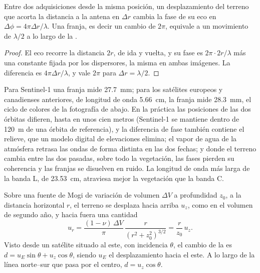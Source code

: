 \begin{theorem}\label{thm:b3:remote-sensing-gis:fringe}
Entre dos adquisiciones desde la misma posición, un desplazamiento del
terreno que acorta la distancia a la antena en $\Delta r$ cambia la
fase de su eco en $\Delta\phi = 4\pi\Delta r/\lambda$. Una franja, es decir un
cambio de $2\pi$, equivale a un movimiento de $\lambda/2$ a lo largo de la .
\end{theorem}

\begin{proof}
El eco recorre la distancia $2r$, de ida y vuelta, y su fase es
$2\pi\cdot 2r/\lambda$ más una constante fijada por los dispersores, la misma en
ambas imágenes. La diferencia es $4\pi\Delta r/\lambda$, y vale $2\pi$
para $\Delta r = \lambda/2$.
\end{proof}

Para Sentinel-1 una franja mide \qty{27.7}{mm}; para los satélites europeos y
canadienses anteriores, de longitud de onda \qty{5.66}{cm}, la franja mide \qty{28.3}{mm}, el
ciclo de colores de la fotografía de abajo. En la práctica las posiciones de las
dos órbitas difieren, hasta en unos cien metros (Sentinel-1 se mantiene
dentro de \qty{120}{m} de una órbita de referencia), y la diferencia de fase
también contiene el relieve, que un modelo digital de elevaciones elimina; el
vapor de agua de la atmósfera retrasa las ondas de forma distinta en las dos fechas;
y donde el terreno cambia entre las dos pasadas, sobre todo la vegetación, las
fases pierden su coherencia y las franjas se disuelven en ruido. La longitud de onda
más larga de la banda L, de \qty{23.53}{cm}, atraviesa mejor la vegetación que la
banda C.

\begin{proposition}\label{prop:b3:remote-sensing-gis:mogi-los}
Sobre una fuente de Mogi de variación de volumen $\Delta V$ a profundidad $z_0$, a la
distancia horizontal $r$, el terreno se desplaza hacia arriba $u_z$, como en el
volumen de segundo año, y hacia fuera una cantidad
\[
u_r = \frac{(1 - \nu)\,\Delta V}{\pi}\,\frac{r}{(r^2 + z_0^2)^{3/2}} = \frac{r}{z_0}\,u_z .
\]
Visto desde un satélite situado al este, con incidencia $\theta$, el cambio de
la  es $d = u_E\sin\theta + u_z\cos\theta$, siendo $u_E$ el
desplazamiento hacia el este. A lo largo de la línea norte--sur que pasa por el centro,
$d = u_z\cos\theta$.
\end{proposition}

